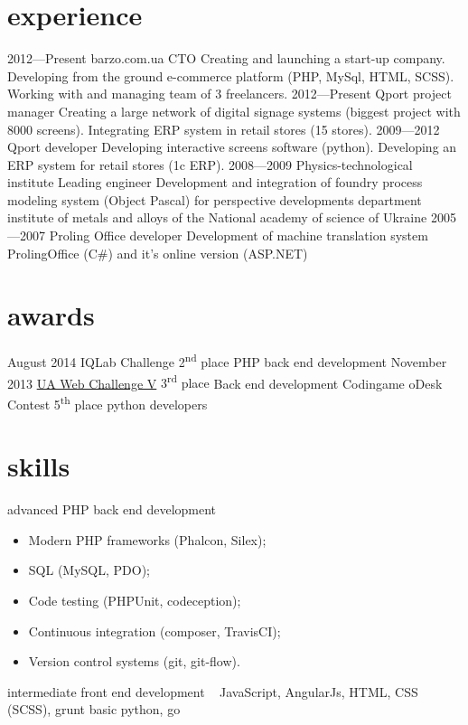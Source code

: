 \documentclass[hidelinks,a4paper]{cv}
\begin{document}
\section{experience}

\begin{entrylist}
  \entry
    {2012—Present}
    {barzo.com.ua}
    {CTO}
    {Creating and launching a start-up company. Developing from the ground e-commerce platform (PHP, MySql, HTML, SCSS). Working with and managing team of 3 freelancers.
    }
  \entry
    {2012—Present}
    {Qport}
    {project manager}
    {
    Creating a large network of digital signage systems (biggest project with 8000 screens).
    Integrating ERP system in retail stores (15 stores).
    }
  \entry
    {2009—2012}
    {Qport}
    {developer}
    {
    Developing interactive screens software (python). 
    Developing an ERP system for retail stores (1c ERP).
    }
  \entry
    {2008—2009} 
    {Physics-technological institute}
    {Leading engineer}
    {Development and integration of foundry process modeling system (Object Pascal) for perspective developments department institute of metals and alloys of the National academy of science of Ukraine}
  \entry
    {2005—2007}
    {Proling Office}
    {developer}
    {Development of machine translation system ProlingOffice (C\#) and it's online version (ASP.NET)}
\end{entrylist}

\section{awards}

\begin{entrylist}
  \entry
   {August 2014}
   {IQLab Challenge}
   {2\textsuperscript{nd} place}
   {PHP back end development}
  \entry  
   {November 2013}
   {\href{http://uawebchallenge.com/news/v-final-results}{UA Web Challenge V}}
   {3\textsuperscript{rd} place}
   {Back end development}
  \entry  
   {}
   {Codingame oDesk Contest}
   {5\textsuperscript{th} place}
   {python developers}
\end{entrylist}

\newpage{}

\section{skills}
\begin{entrylist}
  \entry
   {advanced}
   {PHP back end development}
   {~}
   {
   \begin{itemize}
      \item Modern PHP frameworks (Phalcon, Silex);
      \item SQL (MySQL, PDO);
      \item Code testing (PHPUnit, codeception);
      \item Continuous integration (composer, TravisCI);
      \item Version control systems (git, git-flow).
    \end{itemize}
   }
  \entry
   {intermediate}
   {front end development}
   {~}
   {JavaScript, AngularJs, HTML, CSS (SCSS), grunt}
  \entry
   {basic}
   {python, go}
   {~}
   {~}
\end{entrylist}
\end{document}
